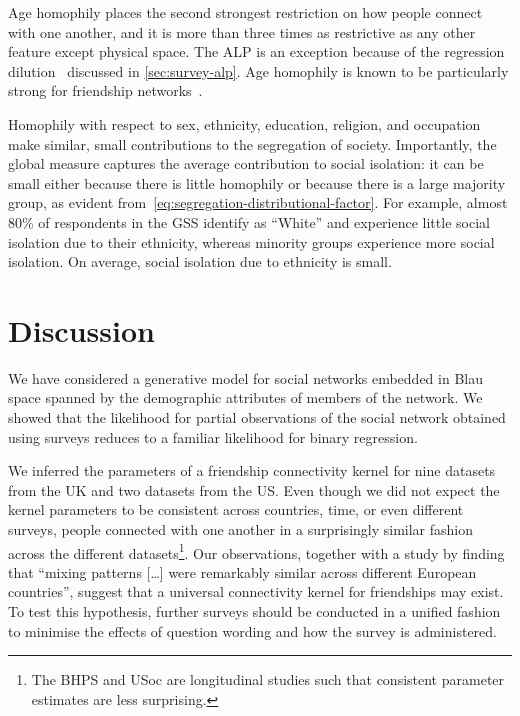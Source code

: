 \documentclass{scrartcl}
\begin{document}
Age homophily places the second strongest restriction on how people connect with one another, and it is more than three times as restrictive as any other feature except physical space. The ALP is an exception because of the regression dilution~\cite{Hutcheon2010} discussed in \cref{sec:survey-alp}. Age homophily is known to be particularly strong for friendship networks~\cite{McPherson2001}.

Homophily with respect to sex, ethnicity, education, religion, and occupation make similar, small contributions to the segregation of society. Importantly, the global measure captures the average contribution to social isolation: it can be small either because there is little homophily or because there is a large majority group, as evident from~\cref{eq:segregation-distributional-factor}. For example, almost 80\% of respondents in the GSS identify as ``White'' and experience little social isolation due to their ethnicity, whereas minority groups experience more social isolation. On average, social isolation due to ethnicity is small.

\section{Discussion}

We have considered a generative model for social networks embedded in Blau space spanned by the demographic attributes of members of the network. We showed that the likelihood for partial observations of the social network obtained using surveys reduces to a familiar likelihood for binary regression. %

We inferred the parameters of a friendship connectivity kernel for nine datasets from the UK and two datasets from the US. Even though we did not expect the kernel parameters to be consistent across countries, time, or even different surveys, people connected with one another in a surprisingly similar fashion across the different datasets\footnote{The BHPS and USoc are longitudinal studies such that consistent parameter estimates are less surprising.}. Our observations, together with a study by \textcite{Mossong2008} finding that ``mixing patterns [\ldots] were remarkably similar across different European countries'', suggest that a universal connectivity kernel for friendships may exist. To test this hypothesis, further surveys should be conducted in a unified fashion to minimise the effects of question wording and how the survey is administered.
\end{document}
